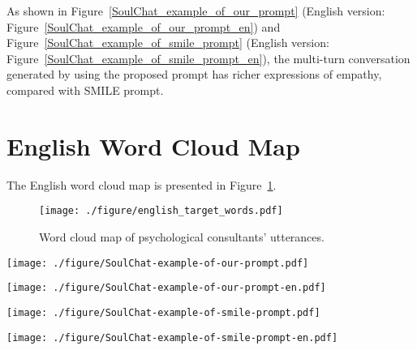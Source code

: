 \documentclass[11pt]{article}
\begin{document}
As shown in Figure~\ref{SoulChat_example_of_our_prompt} (English version: Figure~\ref{SoulChat_example_of_our_prompt_en}) and Figure~\ref{SoulChat_example_of_smile_prompt} (English version: Figure~\ref{SoulChat_example_of_smile_prompt_en}), the multi-turn conversation generated by using the proposed prompt has richer expressions of empathy, compared with SMILE prompt.


\section{English Word Cloud Map}
The English word cloud map is presented in Figure~\ref{english_target_words}.
\label{sec:english_target_words}
\begin{figure}[htbp]
  \centering
  \texttt{[image: ./figure/english\_target\_words.pdf]}
  \caption{Word cloud map of psychological consultants' utterances.
}
  \label{english_target_words}
\end{figure}


\begin{figure*}[htbp]
  \centering
  \texttt{[image: ./figure/SoulChat-example-of-our-prompt.pdf]}
  \caption{Multi-turn conversation generated by ChatGPT using the proposed prompt.
}
  \label{SoulChat_example_of_our_prompt}
\end{figure*}
\begin{figure*}[htbp]
  \centering
  \texttt{[image: ./figure/SoulChat-example-of-our-prompt-en.pdf]}
  \caption{Multi-turn conversation generated by ChatGPT using the proposed prompt (English version).
}
  \label{SoulChat_example_of_our_prompt_en}
\end{figure*}

\begin{figure*}[htbp]
  \centering
  \texttt{[image: ./figure/SoulChat-example-of-smile-prompt.pdf]}
  \caption{Multi-turn conversation generated by ChatGPT using the SMILE prompt.
}
  \label{SoulChat_example_of_smile_prompt}
\end{figure*}

\begin{figure*}[htbp]
  \centering
  \texttt{[image: ./figure/SoulChat-example-of-smile-prompt-en.pdf]}
  \caption{Multi-turn conversation generated by ChatGPT using the SMILE prompt (English version).
}
  \label{SoulChat_example_of_smile_prompt_en}
\end{figure*}
\end{document}
